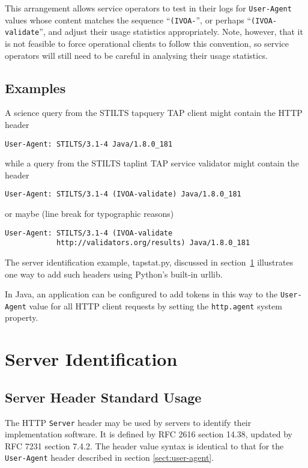 \documentclass[11pt,a4paper]{ivoa}
\newcommand{\headername}[1]{{\tt #1}}
\begin{document}
This arrangement allows service operators to test in their logs for
\headername{User-Agent} values
whose content matches the sequence ``\verb|(IVOA-|'', or
perhaps ``\verb|(IVOA-validate|'', and adjust their usage statistics
appropriately. Note, however, that it is not feasible to force operational
clients to follow this convention, so service operators will still need
to be careful in analysing their usage statistics.

\subsection{Examples}

A science query from the STILTS tapquery TAP client might contain the
HTTP header
\begin{verbatim}
User-Agent: STILTS/3.1-4 Java/1.8.0_181
\end{verbatim}
while a query from the STILTS taplint TAP service validator might
contain the header
\begin{verbatim}
User-Agent: STILTS/3.1-4 (IVOA-validate) Java/1.8.0_181
\end{verbatim}
or maybe (line break for typographic reasons)
\begin{verbatim}
User-Agent: STILTS/3.1-4 (IVOA-validate
            http://validators.org/results) Java/1.8.0_181
\end{verbatim}

The server identification example, tapstat.py, discussed in
section~\ref{sect:server} illustrates one way to add such headers using
Python's built-in urllib.

In Java, an application can be configured to add tokens in this way
to the \headername{User-Agent} value for all HTTP client requests
by setting the {\tt http.agent} system property.


\section{Server Identification}
\label{sect:server}

\subsection{Server Header Standard Usage}

The HTTP \headername{Server} header may be used by servers to
identify their implementation software.
It is defined by RFC 2616 section 14.38,
updated by RFC 7231 section 7.4.2.
The header value syntax is identical to that for the
\headername{User-Agent} header described in section \ref{sect:user-agent}.
\end{document}
